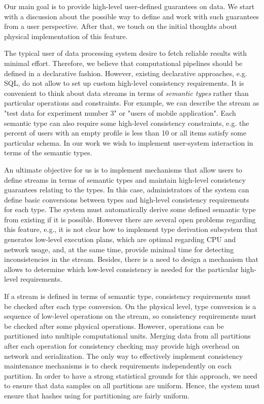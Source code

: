 \label{fs-phd-reliable}

Our main goal is to provide high-level user-defined guarantees on data. We start with a discussion about the possible way to define and work with such guarantees from a user perspective. After that, we touch on the initial thoughts about physical implementation of this feature.

The typical user of data processing system desire to fetch reliable results with minimal effort. Therefore, we believe that computational pipelines should be defined in a declarative fashion. However, existing declarative approaches, e.g. SQL, do not allow to set up custom high-level consistency requirements. It is convenient to think about data streams in terms of {\em semantic types} rather than particular operations and constraints. For example, we can describe the stream as "test data for experiment number 3" or "users of mobile application". Each semantic type can also require some high-level consistency constraints, e.g. the percent of users with an empty profile is less than 10 or all items satisfy some particular schema. In our work we wish to implement user-system interaction in terms of the semantic types.

An ultimate objective for us is to implement mechanisms that allow users to define streams in terms of semantic types and maintain high-level consistency guarantees relating to the types. In this case, administrators of the system can define basic conversions between types and high-level consistency requirements for each type. The system must automatically derive some defined semantic type from existing if it is possible. However there are several open problems regarding this feature, e.g., it is not clear how to implement type derivation subsystem that generates low-level execution plans, which are optimal regarding CPU and network usage, and, at the same time, provide minimal time for detecting inconsistencies in the stream. Besides, there is a need to design a mechanism that allows to determine which low-level consistency is needed for the particular high-level requirements.  

If a stream is defined in terms of semantic type, consistency requirements must be checked after each type conversion. On the physical level, type conversion is a sequence of low-level operations on the stream, so consistency requirements must be checked after some physical operations. However, operations can be partitioned into multiple computational units. Merging data from all partitions after each operation for consistency checking may provide high overhead on network and serialization. The only way to effectively implement consistency maintenance mechanisms is to check requirements independently on each partition. In order to have a strong statistical grounds for this approach, we need to ensure that data samples on all partitions are uniform. Hence, the system must ensure that hashes using for partitioning are fairly uniform.

